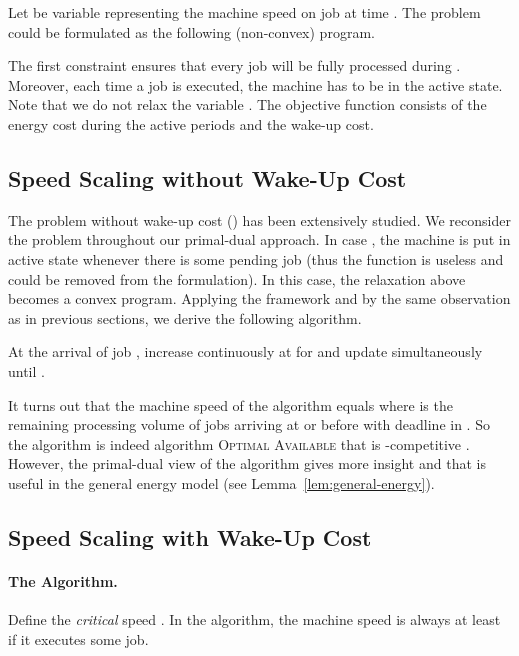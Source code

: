 \documentclass[11pt]{article}
\begin{document}
Let  be variable representing the machine speed on job  at time .   
The problem could be formulated as the following (non-convex) program.
 
  
The first constraint ensures that every job  will be fully processed during .
Moreover, each time a job is executed, the machine has to be in the active state. 
Note that we do not relax the variable . The objective function consists of 
the energy cost during the active periods and the wake-up cost. 

\subsection{Speed Scaling without Wake-Up Cost}
The problem without wake-up cost () has been extensively studied. 
We reconsider the problem throughout our primal-dual approach. In case ,
the machine is put in active state whenever there is some pending job (thus the function
 is useless and could be removed from the formulation).  
In this case, the relaxation above becomes a convex program. Applying the framework and by the same
observation as in previous sections, we derive the following algorithm.

At the arrival of job , increase continuously  at  for 
and update simultaneously  until .

It turns out that the machine speed  of the algorithm equals 
where  is the remaining processing volume of jobs arriving at or before 
with deadline in . So the algorithm is indeed algorithm \textsc{Optimal Available} \cite{YaoDemers95:A-Scheduling-Model}
that is -competitive \cite{BansalKimbrel07:Speed-scaling}.
However, the primal-dual view of the algorithm gives more insight and that is useful 
in the general energy model (see Lemma~\ref{lem:general-energy}). 

\subsection{Speed Scaling with Wake-Up Cost}

\paragraph{The Algorithm.}
Define the \emph{critical} speed .
In the algorithm, the machine speed is always at least  if it executes some job.
 
\end{document}
